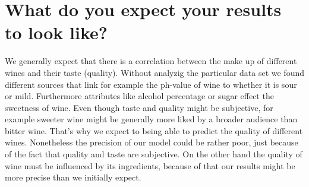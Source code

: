 \documentclass[11pt,titlepage,oneside,openany]{article}
\begin{document}
\section{What do you expect your results to look like?}
We generally expect that there is a correlation between the make up of different wines and their taste (quality). Without analyzig the particular data set we found different sources that link for example the ph-value of wine to whether it is sour or mild. Furthermore attributes like alcohol percentage or sugar effect the sweetness of wine. Even though taste and quality might be subjective, for example sweeter wine might be generally more liked by a broader audience than bitter wine. That's why we expect to being able to predict the quality of different wines. Nonetheless the precision of our model could be rather poor, just because of the fact that quality and taste are subjective. On the other hand the quality of wine must be influenced by its ingredients, because of that our results might be more precise than we initially expect.

%
%









\end{document}
